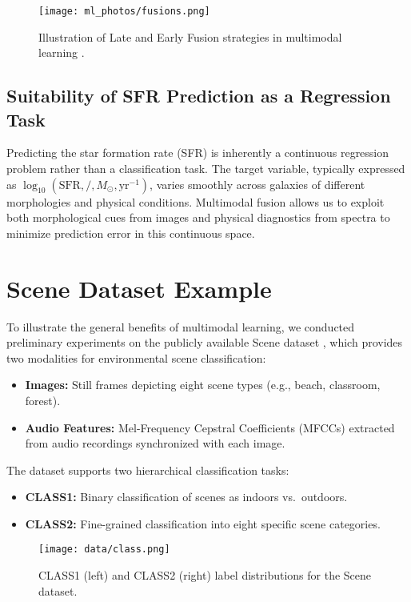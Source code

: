 \documentclass[english,bachelor,oneside]{ctufit-thesis}
\begin{document}
\begin{figure}[h]
  \centering
  \texttt{[image: ml\_photos/fusions.png]}
  \caption{Illustration of Late and Early Fusion strategies in multimodal learning \cite{Illustra28:online}.}
  \label{fig:fusion_strategies}
\end{figure}

\subsection{Suitability of SFR Prediction as a Regression Task}
Predicting the star formation rate (SFR) is inherently a continuous regression problem rather than a classification task. The target variable, typically expressed as $\log_{10}(\mathrm{SFR},/,M_\odot,\mathrm{yr}^{-1})$, varies smoothly across galaxies of different morphologies and physical conditions. Multimodal fusion allows us to exploit both morphological cues from images and physical diagnostics from spectra to minimize prediction error in this continuous space.

\section{Scene Dataset Example}
To illustrate the general benefits of multimodal learning, we conducted preliminary experiments on the publicly available Scene dataset \cite{SceneCla95:online}, which provides two modalities for environmental scene classification:
\begin{itemize}
\item \textbf{Images:} Still frames depicting eight scene types (e.g., beach, classroom, forest).
\item \textbf{Audio Features:} Mel-Frequency Cepstral Coefficients (MFCCs) extracted from audio recordings synchronized with each image.
\end{itemize}

The dataset supports two hierarchical classification tasks:
\begin{itemize}
\item \textbf{CLASS1:} Binary classification of scenes as indoors vs.\ outdoors.
\item \textbf{CLASS2:} Fine-grained classification into eight specific scene categories.
\end{itemize}

\begin{figure}[h]
\centering
\texttt{[image: data/class.png]}
\caption{CLASS1 (left) and CLASS2 (right) label distributions for the Scene dataset.}
\label{fig:scene_pie_example}
\end{figure}
\end{document}
